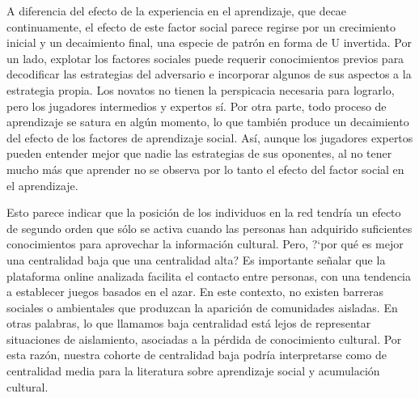 \documentclass[a4paper,11pt]{book}
\theoremstyle{definition}
\begin{document}
A diferencia del efecto de la experiencia en el aprendizaje, que decae continuamente, el efecto de este factor social parece regirse por un crecimiento inicial y un decaimiento final, una especie de patr\'on en forma de U invertida.
%
Por un lado, explotar los factores sociales puede requerir conocimientos previos para decodificar las estrategias del adversario e incorporar algunos de sus aspectos a la estrategia propia.
%
Los novatos no tienen la perspicacia necesaria para lograrlo, pero los jugadores intermedios y expertos s\'i.
%
Por otra parte, todo proceso de aprendizaje se satura en alg\'un momento, lo que tambi\'en produce un decaimiento del efecto de los factores de aprendizaje social.
%
As\'i, aunque los jugadores expertos pueden entender mejor que nadie las estrategias de sus oponentes, al no tener mucho m\'as que aprender no se observa por lo tanto el efecto del factor social en el aprendizaje.


Esto parece indicar que la posici\'on de los individuos en la red tendr\'ia un efecto de segundo orden que s\'olo se activa cuando las personas han adquirido suficientes conocimientos para aprovechar la informaci\'on cultural.
%
Pero, ?`por qu\'e es mejor una centralidad baja que una centralidad alta?
%
Es importante se\~nalar que la plataforma online analizada facilita el contacto entre personas, con una tendencia a establecer juegos basados en el azar.
%
En este contexto, no existen barreras sociales o ambientales que produzcan la aparici\'on de comunidades aisladas.
%
En otras palabras, lo que llamamos baja centralidad est\'a lejos de representar situaciones de aislamiento, asociadas a la p\'erdida de conocimiento cultural.
%
Por esta raz\'on, nuestra cohorte de centralidad baja podr\'ia interpretarse como de centralidad media para la literatura sobre aprendizaje social y acumulaci\'on cultural.

\end{document}
